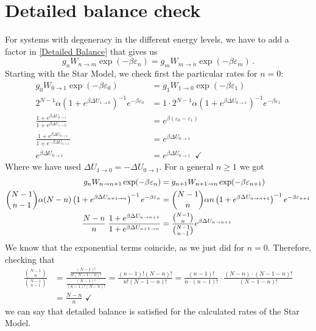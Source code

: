 \section{Detailed balance check}\label{Detailed Balance Check}
For systems with degeneracy in the different energy levels, we have to add a factor in \ref{Detailed Balance} that gives us
\begin{equation}
    g_n W_{n\to m} \exp(-\beta \varepsilon_n) = g_m W_{m\to n} \exp(-\beta \varepsilon_m) \,.
\end{equation}
Starting with the Star Model, we check first the particular rates for $n=0$:
\begin{align}
    g_0 W_{0\to 1} \exp(-\beta \varepsilon_0) &= g_1 W_{1\to 0} \exp(-\beta \varepsilon_1) \\
    2^{N-1}\alpha(1+e^{\beta \Delta U_{1\to 0}})^{-1}e^{-\beta\varepsilon_0}&=1\cdot2^{N-1}\alpha(1+e^{\beta \Delta U_{0\to 1}})^{-1}e^{-\beta\varepsilon_1} \\
    \frac{1+e^{\beta \Delta U_{0\to 1}}}{1+e^{\beta \Delta U_{1\to 0}}}&=e^{\beta(\varepsilon_0-\varepsilon_1)} \\
    \frac{1+e^{\beta \Delta U_{0\to 1}}}{1+e^{-\beta \Delta U_{0\to 1}}}&=e^{\beta\Delta U_{0\to 1}}\\
    e^{\beta\Delta U_{0\to 1}}&=e^{\beta\Delta U_{0\to 1}}\,\,\, \checkmark
\end{align}
Where we have used $\Delta U_{1\to0}=-\Delta U_{0\to1}$. For a general $n\geq1$ we got
\begin{align}
    g_n W_{n\to n+1} \exp(-\beta \varepsilon_n) &= g_{n+1} W_{n+1\to n} \exp(-\beta \varepsilon_{n+1}) \\
    \binom{N-1}{n-1}\alpha(N-n)\left(1+e^{\beta \Delta U_{n+1\to n}} \right)^{-1}e^{-\beta\varepsilon_n}&=\binom{N-1}{n}\alpha n\left(1+e^{\beta \Delta U_{n\to n+1}} \right)^{-1}e^{-\beta\varepsilon_{n+1}} \\ 
    \frac{N-n}{n}\hspace{0.09 cm}\frac{1+e^{\beta \Delta U_{n\to n+1}}}{1+e^{\beta \Delta U_{n+1\to n}}}&=\frac{\binom{N-1}{n}}{\binom{N-1}{n-1}}e^{\beta \Delta U_{n\to n+1}}
\end{align}
We know that the exponential terms coincide, as we just did for $n=0$. Therefore, checking that 
\begin{align}
\frac{\binom{N-1}{n}}{\binom{N-1}{n-1}} &= \frac{\frac{(N-1)!}{n!(N-1-n)!}}{\frac{(N-1)!}{(n-1)!(N-n)!}} = \frac{(n-1)!(N-n)!}{n!(N-1-n)!} = \frac{(n-1)!}{n \cdot (n-1)!} \cdot \frac{(N-n)\cdot(N-1-n)!}{(N-1-n)!} \\
&= \frac{N - n}{n} \,\, \checkmark 
\end{align}
we can say that detailed balance is satisfied for the calculated rates of the Star Model.

